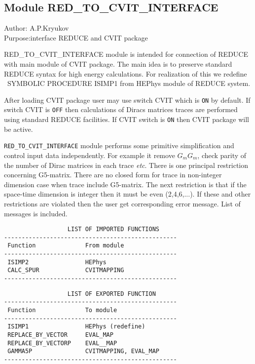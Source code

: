 \subsection*{Module RED\_TO\_CVIT\_INTERFACE}

\begin{center}
Author: A.P.Kryukov \\
Purpose:interface REDUCE and CVIT package
\end{center}

RED\_TO\_CVIT\_INTERFACE module is intended for connection of REDUCE
with main module of CVIT package. The main idea is to preserve
standard REDUCE syntax for high energy calculations.  For realization
of this we redefine {\ SYMBOLIC PROCEDURE ISIMP1} from HEPhys module of
REDUCE system.

After loading CVIT package user may use switch CVIT which is {\tt ON} by
default.  If switch CVIT is {\tt OFF} then calculations of Diracs matrices
traces are performed using standard REDUCE facilities. If CVIT switch
is {\tt ON} then CVIT package will be active.

{\tt RED\_TO\_CVIT\_INTERFACE} module performs some primitive simplification
and control input data independently.  For example it remove $G_mG_m$,
check parity of the number of Dirac matrices in each trace {\em etc}.
There is one principal restriction concerning G5-matrix. There are no
closed form for trace in non-integer dimension case when trace include
G5-matrix.  The next restriction is that if the space-time dimension
is integer then it must be even (2,4,6,...).  If these and other
restrictions are violated then the user get corresponding error
message. List of messages is included.

\begin{center}
\begin{verbatim}
                  LIST OF IMPORTED FUNCTIONS
-------------------------------------------------
 Function              From module
-------------------------------------------------
 ISIMP2                HEPhys
 CALC_SPUR             CVITMAPPING
-------------------------------------------------
\end{verbatim}

\begin{verbatim}
                  LIST OF EXPORTED FUNCTION
-------------------------------------------------
 Function              To module
-------------------------------------------------
 ISIMP1                HEPhys (redefine)
 REPLACE_BY_VECTOR     EVAL_MAP
 REPLACE_BY_VECTORP    EVAL__MAP
 GAMMA5P               CVITMAPPING, EVAL_MAP
-------------------------------------------------
\end{verbatim}
\end{center}



